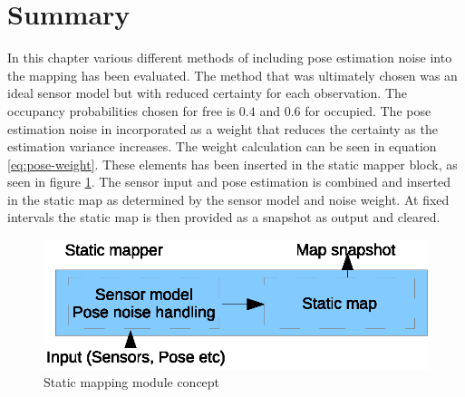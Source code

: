 \section{Summary}
In this chapter various different methods of including pose estimation noise into the mapping has been evaluated. The method that was ultimately chosen was an ideal sensor model but with reduced certainty for each observation. The occupancy probabilities chosen for free is \(0.4\) and \(0.6\) for occupied. The pose estimation noise in incorporated as a weight that reduces the certainty as the estimation variance increases. The weight calculation can be seen in equation \ref{eq:pose-weight}. 
These elements has been inserted in the static mapper block, as seen in figure \ref{fig:static_map_detail}. 
The sensor input and pose estimation is combined and inserted in the static map as determined by the sensor model and noise weight. At fixed intervals the static map is then provided as a snapshot as output and cleared. 

\begin{figure}[htbp]
	\centering
	\includegraphics[scale=1]{chapters/static_mapping/figures/static_map_detail.eps}
	\caption{Static mapping module concept}
	\label{fig:static_map_detail}
\end{figure}

